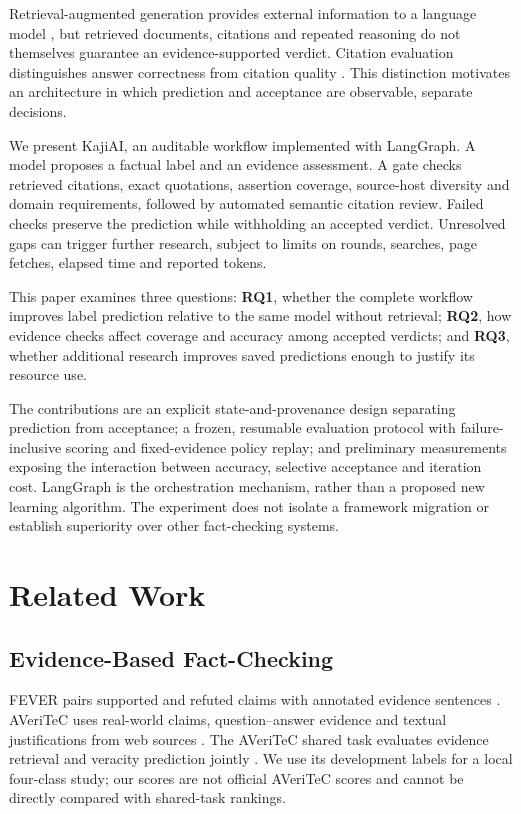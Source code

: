 \documentclass[conference]{IEEEtran}
\begin{document}
Retrieval-augmented generation provides external information to a language model \cite{rag}, but retrieved documents, citations and repeated reasoning do not themselves guarantee an evidence-supported verdict. Citation evaluation distinguishes answer correctness from citation quality \cite{alce}. This distinction motivates an architecture in which prediction and acceptance are observable, separate decisions.

We present KajiAI, an auditable workflow implemented with LangGraph. A model proposes a factual label and an evidence assessment. A gate checks retrieved citations, exact quotations, assertion coverage, source-host diversity and domain requirements, followed by automated semantic citation review. Failed checks preserve the prediction while withholding an accepted verdict. Unresolved gaps can trigger further research, subject to limits on rounds, searches, page fetches, elapsed time and reported tokens.

This paper examines three questions: \textbf{RQ1}, whether the complete workflow improves label prediction relative to the same model without retrieval; \textbf{RQ2}, how evidence checks affect coverage and accuracy among accepted verdicts; and \textbf{RQ3}, whether additional research improves saved predictions enough to justify its resource use.

The contributions are an explicit state-and-provenance design separating prediction from acceptance; a frozen, resumable evaluation protocol with failure-inclusive scoring and fixed-evidence policy replay; and preliminary measurements exposing the interaction between accuracy, selective acceptance and iteration cost. LangGraph is the orchestration mechanism, rather than a proposed new learning algorithm. The experiment does not isolate a framework migration or establish superiority over other fact-checking systems.

\section{Related Work}
\subsection{Evidence-Based Fact-Checking}
FEVER pairs supported and refuted claims with annotated evidence sentences \cite{fever}. AVeriTeC uses real-world claims, question--answer evidence and textual justifications from web sources \cite{averitec}. The AVeriTeC shared task evaluates evidence retrieval and veracity prediction jointly \cite{sharedtask}. We use its development labels for a local four-class study; our scores are not official AVeriTeC scores and cannot be directly compared with shared-task rankings.
\end{document}

